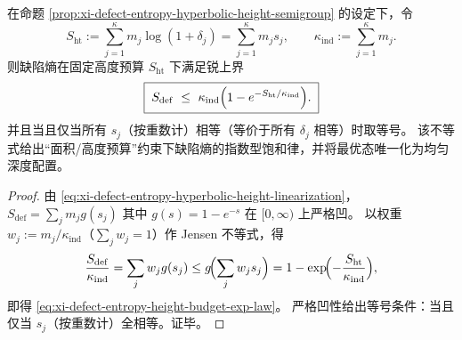 \begin{corollary}\label{cor:xi-defect-entropy-height-budget-exponential-law}
在命题 \ref{prop:xi-defect-entropy-hyperbolic-height-semigroup} 的设定下，令
\[
S_{\mathrm{ht}}:=\sum_{j=1}^{\kappa}m_j\log(1+\delta_j)=\sum_{j=1}^{\kappa}m_j s_j,
\qquad
\kappa_{\mathrm{ind}}:=\sum_{j=1}^{\kappa}m_j.
\]
则缺陷熵在固定高度预算 \(S_{\mathrm{ht}}\) 下满足锐上界
\begin{equation}\label{eq:xi-defect-entropy-height-budget-exp-law}
\boxed{\;
S_{\mathrm{def}}
\ \le\
\kappa_{\mathrm{ind}}\Bigl(1-e^{-S_{\mathrm{ht}}/\kappa_{\mathrm{ind}}}\Bigr).\;}
\end{equation}
并且当且仅当所有 \(s_j\)（按重数计）相等（等价于所有 \(\delta_j\) 相等）时取等号。
该不等式给出“面积/高度预算”约束下缺陷熵的指数型饱和律，并将最优态唯一化为均匀深度配置。
\end{corollary}
\begin{proof}
由 \eqref{eq:xi-defect-entropy-hyperbolic-height-linearization}，
\(
S_{\mathrm{def}}=\sum_j m_j g(s_j)
\)
其中 \(g(s)=1-e^{-s}\) 在 \([0,\infty)\) 上严格凹。
以权重 \(w_j:=m_j/\kappa_{\mathrm{ind}}\)（\(\sum_j w_j=1\)）作 Jensen 不等式，得
\[
\frac{S_{\mathrm{def}}}{\kappa_{\mathrm{ind}}}
=\sum_j w_j g(s_j)
\le g\!\Bigl(\sum_j w_j s_j\Bigr)
=1-\exp\!\Bigl(-\frac{S_{\mathrm{ht}}}{\kappa_{\mathrm{ind}}}\Bigr),
\]
即得 \eqref{eq:xi-defect-entropy-height-budget-exp-law}。
严格凹性给出等号条件：当且仅当 \(s_j\)（按重数计）全相等。证毕。
\end{proof}

